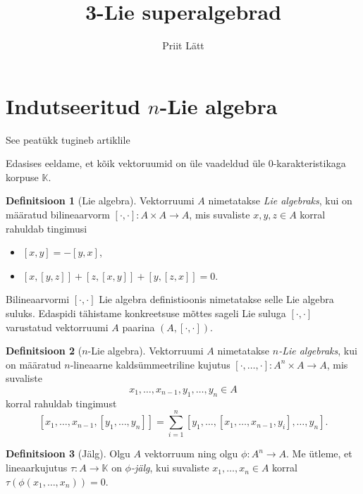 \documentclass[12pt,a4paper]{article}
\author{Priit Lätt}
\title{3-Lie superalgebrad}
\theoremstyle{plain}
\theoremstyle{definition}
\newtheorem{dfn}{Definitsioon}[section]
\newcommand{\K}{\mathbb{K}}
\newcommand{\col}{\colon}
\newcommand{\arr}{\rightarrow}
\newcommand{\brac}[2]{\ensuremath{\left[ #1, #2 \right]}}
\newcommand{\nbrac}[2]{\ensuremath{\left[ #1, \dots, #2 \right]}}
\begin{document}

\section{Indutseeritud \texorpdfstring{$n$}\ -Lie algebra}

See peatükk tugineb artiklile \cite{AKMS:2014}

Edasises eeldame, et kõik vektoruumid on üle vaadeldud üle
$0$-karakteristikaga korpuse $\K$.

\begin{dfn}[Lie algebra]\label{def:lie_algebra}
    Vektorruumi $A$ nimetatakse \emph{Lie algebraks}, kui on
    määratud bilineaarvorm
    $\brac{\cdot}{\cdot} \colon A \times A \arr A$, mis
    suvaliste $x, y, z \in A$ korral rahuldab tingimusi
    \begin{itemize}
        \item $\brac{x}{y} = -\brac{y}{x}$,
        \item $\brac{x}{\brac{y}{z}} + 
               \brac{z}{\brac{x}{y}} +
               \brac{y}{\brac{z}{x}} = 0$.
    \end{itemize}
\end{dfn}

Bilineaarvormi $\brac{\cdot}{\cdot}$ Lie algebra definistioonis
nimetatakse selle Lie algebra suluks. Edaspidi tähistame konkreetsuse
mõttes sageli Lie suluga $\brac{\cdot}{\cdot}$ varustatud vektorruumi
$A$ paarina $(A, \brac{\cdot}{\cdot})$.

\begin{dfn}[$n$-Lie algebra]
    Vektorruumi $A$ nimetatakse \emph{$n$-Lie algebraks}, kui on
    määratud $n$-lineaarne kaldsümmeetriline kujutus
    $\nbrac{\cdot}{\cdot} \colon A^n \times A \arr A$, mis
    suvaliste
    \[ x_1, \dots, x_{n-1}, y_1, \dots, y_n \in A \]
    korral rahuldab tingimust
    \[
        \left[ x_1, \dots, x_{n-1}, \nbrac{y_1}{y_n} \right] =
        \sum_{i=1}^n \left[
            y_1, \dots, \left[ x_1, \dots, x_{n-1}, y_i \right], \dots, y_n
        \right].
    \]
\end{dfn}

\begin{dfn}[Jälg]
    Olgu $A$ vektorruum ning olgu $\phi \col A^n \arr A$. Me
    ütleme, et lineaarkujutus $\tau \col A \arr \K$ on
    \emph{$\phi$-jälg}, kui suvaliste $x_1, \dots, x_n \in A$ korral
    $\tau \left( \phi \left( x_1, \dots, x_n \right) \right) = 0$.
\end{dfn}
\end{document}
